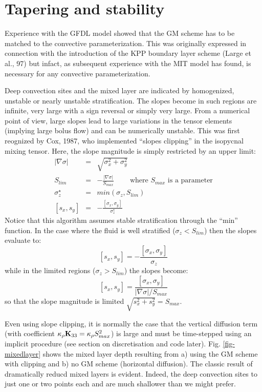 \documentclass[12pt]{article}
\begin{document}
\section{Tapering and stability}

Experience with the GFDL model showed that the GM scheme has to be
matched to the convective parameterization. This was originally
expressed in connection with the introduction of the KPP boundary
layer scheme (Large et al., 97) but infact, as subsequent experience
with the MIT model has found, is necessary for any convective
parameterization.

Deep convection sites and the mixed layer are indicated by
homogenized, unstable or nearly unstable stratification. The slopes
become in such regions are infinite, very large with a sign reversal
or simply very large. From a numerical point of view, large slopes
lead to large variations in the tensor elements (implying large bolus
flow) and can be numerically unstable. This was first reognized by
Cox, 1987, who implemented ``slopes clipping'' in the isopycnal mixing
tensor. Here, the slope magnitude is simply restricted by an upper limit:
\begin{eqnarray}
|\nabla \sigma| & = & \sqrt{ \sigma_x^2 + \sigma_y^2 } \\
S_{lim} & = & - \frac{|\nabla \sigma|}{ S_{max} }
\;\;\;\;\;\;\;\; \mbox{where $S_{max}$ is a parameter} \\
\sigma_z^\star & = & min( \sigma_z , S_{lim} ) \\
{[s_x,s_y]} & = & - \frac{ [\sigma_x,\sigma_y] }{\sigma_z^\star}
\end{eqnarray}
Notice that this algorithm assumes stable stratification through the
``min'' function. In the case where the fluid is well stratified ($\sigma_z < S_{lim}$) then the slopes evaluate to:
\begin{equation}
{[s_x,s_y]} = - \frac{ [\sigma_x,\sigma_y] }{\sigma_z}
\end{equation}
while in the limited regions ($\sigma_z > S_{lim}$) the slopes become:
\begin{equation}
{[s_x,s_y]} = \frac{ [\sigma_x,\sigma_y] }{|\nabla \sigma|/S_{max}}
\end{equation}
so that the slope magnitude is limited $\sqrt{s_x^2 + s_y^2} =
S_{max}$.

Even using slope clipping, it is normally the case that the vertical
diffusion term (with coefficient $\kappa_\rho{\bf K}_{33} = \kappa_\rho
S_{max}^2$) is large and must be time-stepped using an implicit
procedure (see section on discretisation and code later).
Fig. \ref{fig-mixedlayer} shows the mixed layer depth resulting from
a) using the GM scheme with clipping and b) no GM scheme (horizontal
diffusion). The classic result of dramatically reducd mixed layers is
evident. Indeed, the deep convection sites to just one or two points
each and are much shallower than we might prefer.
\end{document}
